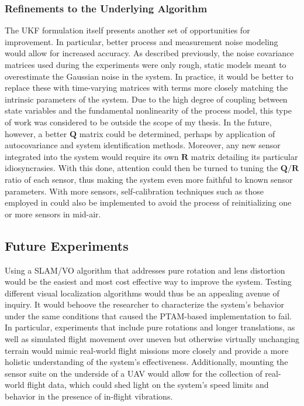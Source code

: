 \subsubsection{Refinements to the Underlying Algorithm}

The UKF formulation itself presents another set of opportunities for improvement. In particular, better process and measurement noise modeling would allow for increased accuracy. As described previously, the noise covariance matrices used during the experiments were only rough, static models meant to overestimate the Gaussian noise in the system. In practice, it would be better to replace these with time-varying matrices with terms more closely matching the intrinsic parameters of the system. Due to the high degree of coupling between state variables and the fundamental nonlinearity of the process model, this type of work was considered to be outside the scope of my thesis. In the future, however, a better $\mathbf{Q}$ matrix could be determined, perhaps by application of autocovariance and system identification methods. Moreover, any new sensor integrated into the system would require its own $\mathbf{R}$ matrix detailing its particular idiosyncrasies. With this done, attention could then be turned to tuning the $\mathbf{Q} / \mathbf{R}$ ratio of each sensor, thus making the system even more faithful to known sensor parameters. With more sensors, self-calibration techniques such as those employed in \cite{Weiss2012} could also be implemented to avoid the process of reinitializing one or more sensors in mid-air.

\subsection{Future Experiments}

Using a SLAM/VO algorithm that addresses pure rotation and lens distortion would be the easiest and most cost effective way to improve the system. Testing different visual localization algorithms would thus be an appealing avenue of inquiry. It would behoove the researcher to characterize the system's behavior under the same conditions that caused the PTAM-based implementation to fail. In particular, experiments that include pure rotations and longer translations, as well as simulated flight movement over uneven but otherwise virtually unchanging terrain would mimic real-world flight missions more closely and provide a more holistic understanding of the system's effectiveness. Additionally, mounting the sensor suite on the underside of a UAV would allow for the collection of real-world flight data, which could shed light on the system's speed limits and behavior in the presence of in-flight vibrations.

